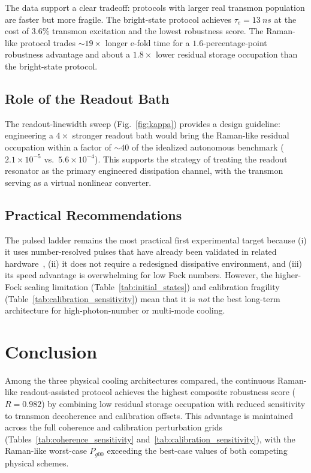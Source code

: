 \documentclass[aps,pra,twocolumn,reprint,floatfix,amsmath,amssymb]{revtex4-2}
\begin{document}
The data support a clear tradeoff: protocols with larger real transmon population are faster but more fragile.
The bright-state protocol achieves $\tau_e = \SI{13}{ns}$ at the cost of $3.6\%$ transmon excitation and the lowest robustness score.
The Raman-like protocol trades ${\sim}19\times$ longer e-fold time for a $1.6$-percentage-point robustness advantage and about a $1.8\times$ lower residual storage occupation than the bright-state protocol.

\subsection{Role of the Readout Bath}

The readout-linewidth sweep (Fig.~\ref{fig:kappa}) provides a design guideline: engineering a $4\times$ stronger readout bath would bring the Raman-like residual occupation within a factor of ${\sim}40$ of the idealized autonomous benchmark ($2.1 \times 10^{-5}$ vs.\ $5.6 \times 10^{-4}$).
This supports the strategy of treating the readout resonator as the primary engineered dissipation channel, with the transmon serving as a virtual nonlinear converter.

\subsection{Practical Recommendations}

The pulsed ladder remains the most practical first experimental target because (i) it uses number-resolved pulses that have already been validated in related hardware~\cite{huang2025fastsideband}, (ii) it does not require a redesigned dissipative environment, and (iii) its speed advantage is overwhelming for low Fock numbers.
However, the higher-Fock scaling limitation (Table~\ref{tab:initial_states}) and calibration fragility (Table~\ref{tab:calibration_sensitivity}) mean that it is \emph{not} the best long-term architecture for high-photon-number or multi-mode cooling.

\section{Conclusion}
\label{sec:conclusion}

Among the three physical cooling architectures compared, the continuous Raman-like readout-assisted protocol achieves the highest composite robustness score ($R = 0.982$) by combining low residual storage occupation with reduced sensitivity to transmon decoherence and calibration offsets.
This advantage is maintained across the full coherence and calibration perturbation grids (Tables~\ref{tab:coherence_sensitivity} and~\ref{tab:calibration_sensitivity}), with the Raman-like worst-case $P_{g00}$ exceeding the best-case values of both competing physical schemes.
\end{document}
